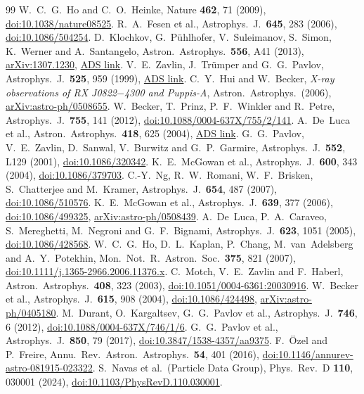 \documentclass[11pt,a4paper]{article}
\newcommand{\doi}[1]{\href{https://doi.org/#1}{doi:#1}}
\newcommand{\arxiv}[1]{\href{https://arxiv.org/abs/#1}{arXiv:#1}}
\newcommand{\ads}[1]{\href{https://ui.adsabs.harvard.edu/abs/#1}{ADS link}}
\begin{document}
\begin{thebibliography}{99}
 W.~C.~G.~Ho and C.~O.~Heinke, Nature \textbf{462}, 71 (2009), \doi{10.1038/nature08525}.
 R.~A.~Fesen et al., Astrophys.\ J.\ \textbf{645}, 283 (2006), \doi{10.1086/504254}.
 D.~Klochkov, G.~P\"uhlhofer, V.~Suleimanov, S.~Simon, K.~Werner and A.~Santangelo, Astron.\ Astrophys.\ \textbf{556}, A41 (2013), \arxiv{1307.1230}, \ads{2013A\%26A...556A..41K}.
 V.~E.~Zavlin, J.~Tr\"umper and G.~G.~Pavlov, Astrophys.\ J.\ \textbf{525}, 959 (1999), \ads{1999ApJ...525..959Z}.
 C.~Y.~Hui and W.~Becker, \emph{X-ray observations of RX J0822$-$4300 and Puppis-A}, Astron.\ Astrophys.\ (2006), \arxiv{astro-ph/0508655}.
 W.~Becker, T.~Prinz, P.~F.~Winkler and R.~Petre, Astrophys.\ J.\ \textbf{755}, 141 (2012), \doi{10.1088/0004-637X/755/2/141}.
 A.~De~Luca et al., Astron.\ Astrophys.\ \textbf{418}, 625 (2004), \ads{2004A\%26A...418..625D}.
 G.~G.~Pavlov, V.~E.~Zavlin, D.~Sanwal, V.~Burwitz and G.~P.~Garmire, Astrophys.\ J.\ \textbf{552}, L129 (2001), \doi{10.1086/320342}.
 K.~E.~McGowan et al., Astrophys.\ J.\ \textbf{600}, 343 (2004), \doi{10.1086/379703}.
 C.-Y.~Ng, R.~W.~Romani, W.~F.~Brisken, S.~Chatterjee and M.~Kramer, Astrophys.\ J.\ \textbf{654}, 487 (2007), \doi{10.1086/510576}.
 K.~E.~McGowan et al., Astrophys.\ J.\ \textbf{639}, 377 (2006), \doi{10.1086/499325}, \arxiv{astro-ph/0508439}.
 A.~De~Luca, P.~A.~Caraveo, S.~Mereghetti, M.~Negroni and G.~F.~Bignami, Astrophys.\ J.\ \textbf{623}, 1051 (2005), \doi{10.1086/428568}.
 W.~C.~G.~Ho, D.~L.~Kaplan, P.~Chang, M.~van~Adelsberg and A.~Y.~Potekhin, Mon.\ Not.\ R.\ Astron.\ Soc.\ \textbf{375}, 821 (2007), \doi{10.1111/j.1365-2966.2006.11376.x}.
 C.~Motch, V.~E.~Zavlin and F.~Haberl, Astron.\ Astrophys.\ \textbf{408}, 323 (2003), \doi{10.1051/0004-6361:20030916}.
 W.~Becker et al., Astrophys.\ J.\ \textbf{615}, 908 (2004), \doi{10.1086/424498}, \arxiv{astro-ph/0405180}.
 M.~Durant, O.~Kargaltsev, G.~G.~Pavlov et al., Astrophys.\ J.\ \textbf{746}, 6 (2012), \doi{10.1088/0004-637X/746/1/6}.
 G.~G.~Pavlov et al., Astrophys.\ J.\ \textbf{850}, 79 (2017), \doi{10.3847/1538-4357/aa9375}.
 F.~\"Ozel and P.~Freire, Annu.\ Rev.\ Astron.\ Astrophys.\ \textbf{54}, 401 (2016), \doi{10.1146/annurev-astro-081915-023322}.
 S.~Navas et al.\ (Particle Data Group), Phys.\ Rev.\ D \textbf{110}, 030001 (2024), \doi{10.1103/PhysRevD.110.030001}.

\end{thebibliography}
\end{document}
